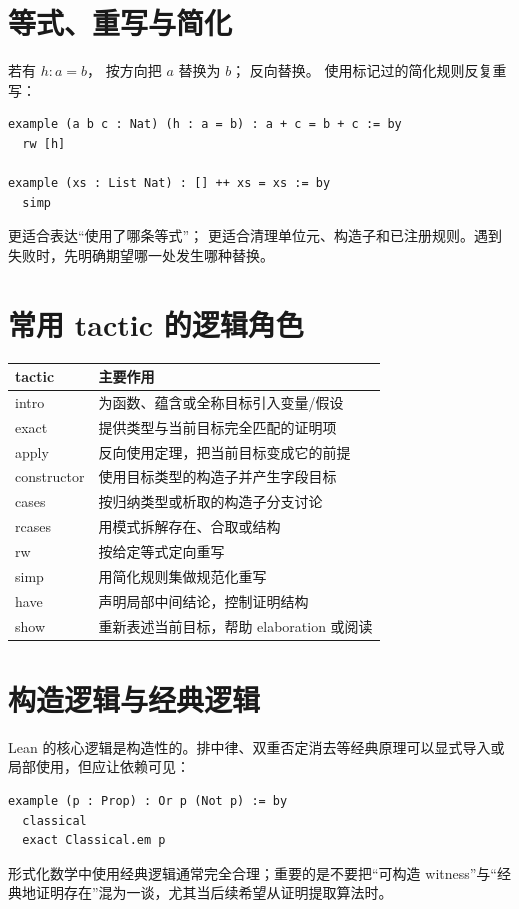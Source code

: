 \section{等式、重写与简化}

若有 $h:a=b$， 按方向把 $a$ 替换为 $b$； 反向替换。 使用标记过的简化规则反复重写：
\begin{lstlisting}
example (a b c : Nat) (h : a = b) : a + c = b + c := by
  rw [h]

example (xs : List Nat) : [] ++ xs = xs := by
  simp
\end{lstlisting}
 更适合表达“使用了哪条等式”； 更适合清理单位元、构造子和已注册规则。遇到失败时，先明确期望哪一处发生哪种替换。

\section{常用 tactic 的逻辑角色}

\begin{center}
\begin{tabularx}{0.94\textwidth}{>{\ttfamily}lX}
\toprule
\normalfont tactic & 主要作用 \\
\midrule
intro & 为函数、蕴含或全称目标引入变量/假设 \\
exact & 提供类型与当前目标完全匹配的证明项 \\
apply & 反向使用定理，把当前目标变成它的前提 \\
constructor & 使用目标类型的构造子并产生字段目标 \\
cases & 按归纳类型或析取的构造子分支讨论 \\
rcases & 用模式拆解存在、合取或结构 \\
rw & 按给定等式定向重写 \\
simp & 用简化规则集做规范化重写 \\
have & 声明局部中间结论，控制证明结构 \\
show & 重新表述当前目标，帮助 elaboration 或阅读 \\
\bottomrule
\end{tabularx}
\end{center}

\section{构造逻辑与经典逻辑}

Lean 的核心逻辑是构造性的。排中律、双重否定消去等经典原理可以显式导入或局部使用，但应让依赖可见：
\begin{lstlisting}
example (p : Prop) : Or p (Not p) := by
  classical
  exact Classical.em p
\end{lstlisting}
形式化数学中使用经典逻辑通常完全合理；重要的是不要把“可构造 witness”与“经典地证明存在”混为一谈，尤其当后续希望从证明提取算法时。

